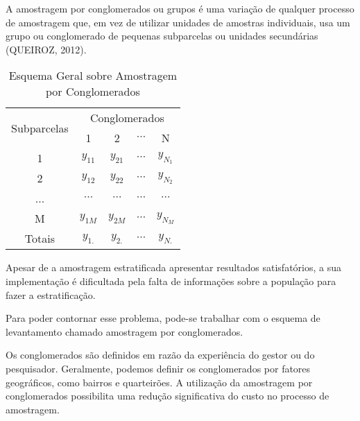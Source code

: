 A amostragem por conglomerados ou grupos é uma variação de qualquer processo de amostragem que, em vez de utilizar unidades de amostras individuais, usa um grupo ou conglomerado de pequenas subparcelas ou unidades secundárias (QUEIROZ, 2012).\vskip0.3cm




\begin{table}[!htb]
\centering
    {
    \caption{Esquema Geral sobre Amostragem por Conglomerados}
    \label{amostras estratificada}
    \vspace{0.1cm}
\begin{tabular}{c|c|c|c|c}
\hline\hline
\multirow{2}{*}{Subparcelas} & \multicolumn{4}{c}{Conglomerados}              \\
                             & 1         & 2        & $\cdots$ & N            \\
\hline
1                            & $y_{11}$  & $y_{21}$ & $\cdots$ & $y_{N_{1}}$  \\
2                            & $y_{12}$  & $y_{22}$ & $\cdots$ & $y_{N_{2}}$  \\
...                          & $\cdots$  & $\cdots$ & $\cdots$ & $\cdots$     \\
M                            & $y_{1M}$  & $y_{2M}$ & $\cdots$ & $y_{N_{M}}$   \\
\hline
Totais                       &  $y_{1.}$ & $y_{2.}$ & $\cdots$ & $y_{N.}$   \\
\hline
\end{tabular}}
\end{table}














\inic Apesar de a amostragem estratificada apresentar resultados
satisfatórios, a sua implementação é dificultada pela falta
de informações sobre a população para fazer a estratificação.\vskip0.3cm

Para poder contornar esse problema, pode-se trabalhar com o
esquema de levantamento chamado amostragem por conglomerados.\vskip0.3cm

Os conglomerados são definidos em razão da experiência
do gestor ou do pesquisador. Geralmente, podemos definir os
conglomerados por fatores geográficos, como bairros e quarteirões.
A utilização da amostragem por conglomerados possibilita uma
redução significativa do custo no processo de amostragem.\vskip0.3cm

